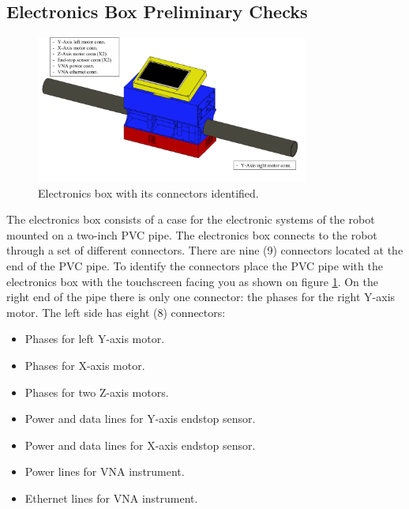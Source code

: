 \documentclass{article}
\begin{document}
\subsection{Electronics Box Preliminary Checks}
\begin{figure}[H]
    \centering
    \includegraphics[width=0.8\textwidth]{images/requirements/text_eb.png}
    \caption{Electronics box with its connectors identified.}
    \label{fig:considerations_electronics_0}
\end{figure}
The electronics box consists of a case for the electronic systems of the robot mounted on a two-inch PVC pipe. The electronics box connects to the robot through a set of different connectors. There are nine (9) connectors located at the end of the PVC pipe. To identify the connectors place the PVC pipe with the electronics box with the touchscreen facing you as shown on figure \ref{fig:considerations_electronics_0}. On the right end of the pipe there is only one connector: the phases for the right Y-axis motor. The left side has eight (8) connectors: 
\begin{itemize}
    \item Phases for left Y-axis motor.
    \item Phases for X-axis motor.
    \item Phases for two Z-axis motors.
    \item Power and data lines for Y-axis endstop sensor.
    \item Power and data lines for X-axis endstop sensor.
    \item Power lines for VNA instrument.
    \item Ethernet lines for VNA instrument.
\end{itemize}
\end{document}
